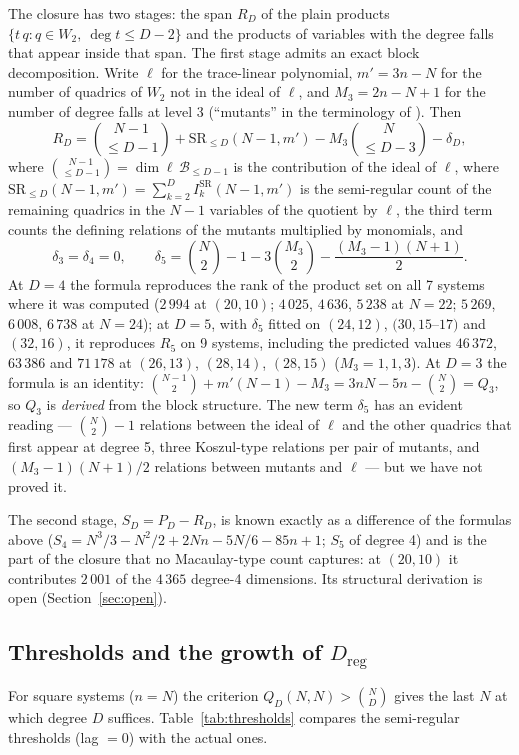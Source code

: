 \documentclass[11pt,a4paper]{article}
\theoremstyle{remark}\newtheorem{remark}{Remark}
\newcommand{\B}{\mathcal{B}}
\newcommand{\Dreg}{D_{\mathrm{reg}}}
\newcommand{\SR}{\mathrm{SR}}
\begin{document}
The closure has two stages: the span $R_D$ of the plain products $\{t\,q: q\in W_2,\ \deg t\le D-2\}$ and the products of variables with the degree falls that appear inside that span. The first stage admits an exact block decomposition. Write $\ell$ for the trace-linear polynomial, $m'=3n-N$ for the number of quadrics of $W_2$ not in the ideal of $\ell$, and $M_3=2n-N+1$ for the number of degree falls at level 3 (``mutants'' in the terminology of \cite{Ding08,BDMM09}). Then
\[
R_D=\binom{N-1}{\le D-1}+\SR_{\le D}(N-1,m')-M_3\binom{N}{\le D-3}-\delta_D,
\]
where $\binom{N-1}{\le D-1}=\dim\ell\,\B_{\le D-1}$ is the contribution of the ideal of $\ell$, where $\SR_{\le D}(N-1,m')=\sum_{k=2}^D I_k^{\SR}(N-1,m')$ is the semi-regular count of the remaining quadrics in the $N-1$ variables of the quotient by $\ell$, the third term counts the defining relations of the mutants multiplied by monomials, and
\[
\delta_3=\delta_4=0,\qquad \delta_5=\binom N2-1-3\binom{M_3}2-\frac{(M_3-1)(N+1)}2 .
\]
At $D=4$ the formula reproduces the rank of the product set on all 7 systems where it was computed ($2\,994$ at $(20,10)$; $4\,025$, $4\,636$, $5\,238$ at $N=22$; $5\,269$, $6\,008$, $6\,738$ at $N=24$); at $D=5$, with $\delta_5$ fitted on $(24,12)$, $(30,15$--$17)$ and $(32,16)$, it reproduces $R_5$ on 9 systems, including the predicted values $46\,372$, $63\,386$ and $71\,178$ at $(26,13)$, $(28,14)$, $(28,15)$ ($M_3=1,1,3$). At $D=3$ the formula is an identity: $\binom{N-1}2+m'(N-1)-M_3=3nN-5n-\binom N2=Q_3$, so $Q_3$ is \emph{derived} from the block structure. The new term $\delta_5$ has an evident reading --- $\binom N2-1$ relations between the ideal of $\ell$ and the other quadrics that first appear at degree 5, three Koszul-type relations per pair of mutants, and $(M_3-1)(N+1)/2$ relations between mutants and $\ell$ --- but we have not proved it.

The second stage, $S_D=P_D-R_D$, is known exactly as a difference of the formulas above ($S_4=N^3/3-N^2/2+2Nn-5N/6-85n+1$; $S_5$ of degree 4) and is the part of the closure that no Macaulay-type count captures: at $(20,10)$ it contributes $2\,001$ of the $4\,365$ degree-4 dimensions. Its structural derivation is open (Section~\ref{sec:open}).

\subsection{Thresholds and the growth of $\Dreg$}

For square systems ($n=N$) the criterion $Q_D(N,N)>\binom ND$ gives the last $N$ at which degree $D$ suffices. Table~\ref{tab:thresholds} compares the semi-regular thresholds (lag $=0$) with the actual ones.
\end{document}
